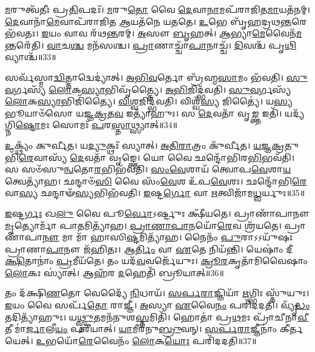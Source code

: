 \-\ul{𑌮}\-𑌰𑍁𑌤𑍍𑌵᳴𑌤𑍀𑌃 𑌪𑍍𑌰\-\ul{𑌤𑌿}\-𑌪𑌦𑌃᳴।
\-\ul{𑌮}\-𑌰𑍁\-\ul{𑌤𑍋} 𑌵𑍈 \ul{𑌦𑍇}\-𑌵𑌾\-\ul{𑌨𑌾}\-𑌮𑌪᳴𑌰𑌾𑌜𑌿𑌤\-\ul{𑌮𑌾}\-𑌯𑌤᳴𑌨𑌮𑍍।
\-\ul{𑌦𑍇}\-𑌵𑌾𑌨𑌾᳴\-\ul{𑌮𑍇}\-𑌵𑌾𑌪᳴𑌰𑌾𑌜𑌿𑌤 \ul{𑌆}\-𑌯𑌤᳴𑌨𑍇 𑌯𑌤𑌤𑍇।
\-\ul{𑌉}\-𑌭𑍇 𑌬𑍃᳴𑌹𑌦𑍍𑌰𑌥\-\ul{𑌨𑍍𑌤}\-𑌰𑍇 𑌭᳴𑌵𑌤𑌃।
\-\ul{𑌇}\-𑌯𑌂 𑌵𑌾𑌵 𑌰᳴𑌥\-\ul{𑌨𑍍𑌤}\-𑌰𑌮𑍍।
\-\ul{𑌅}\-𑌸𑍗 \ul{𑌬𑍃}\-𑌹𑌤𑍍।
\-\ul{𑌆}\-𑌭𑍍𑌯𑌾\-\ul{𑌮𑍇}\-𑌵𑍈𑌨᳴\-\ul{𑌮}\-𑌨𑍍𑌤𑌰𑍇᳴𑌤𑌿।
\-\ul{𑌵𑌾}\-𑌚\-\ul{𑌶𑍍𑌚} 𑌮𑌨᳴𑌸𑌶𑍍𑌚।
\-\ul{𑌪𑍍𑌰𑌾}\-𑌣𑌾𑌚𑍍𑌚𑌾᳴\-\ul{𑌪𑌾}\-𑌨𑌾𑌚𑍍𑌚᳴।
\-\ul{𑌦𑌿}\-𑌵𑌶𑍍𑌚᳴ 𑌪𑍃\-\ul{𑌥𑌿}\-𑌵𑍍𑌯𑌾𑌶𑍍𑌚᳴॥33॥

𑌸𑌰𑍍𑌵᳴𑌸𑍍𑌮𑌾\-\ul{𑌦𑍍𑌵𑌿}\-𑌤𑍍𑌤𑌾𑌦𑍍𑌵𑍇𑌦𑍍𑌯𑌾॑𑌤𑍍।
\-\ul{𑌅}\-\-\ul{𑌭𑌿}\-\-\ul{𑌵}\-𑌰𑍍𑌤𑍋 𑌬𑍍𑌰᳴𑌹𑍍𑌮\-\ul{𑌸𑌾}\-𑌮𑌂 𑌭᳴𑌵𑌤𑌿।
\-\ul{𑌸𑍁}\-\-\ul{𑌵}\-𑌰𑍍𑌗𑌸𑍍𑌯᳴ \ul{𑌲𑍋}\-𑌕\-\ul{𑌸𑍍𑌯𑌾}\-𑌭𑌿𑌵𑍃᳴𑌤𑍍𑌤𑍍𑌯𑍈।
\-\ul{𑌅}\-\-\ul{𑌭𑌿}\-𑌜𑌿𑌦𑍍𑌭᳴𑌵𑌤𑌿।
\-\ul{𑌸𑍁}\-\-\ul{𑌵}\-𑌰𑍍𑌗𑌸𑍍𑌯᳴ \ul{𑌲𑍋}\-𑌕\-\ul{𑌸𑍍𑌯𑌾}\-𑌭𑌿𑌜𑌿᳴𑌤𑍍𑌯𑍈।
\-\ul{𑌵𑌿}\-\-\ul{𑌶𑍍𑌵}\-𑌜𑌿𑌦𑍍𑌭᳴𑌵𑌤𑌿।
𑌵𑌿𑌶𑍍𑌵᳴\-\ul{𑌸𑍍𑌯} 𑌜𑌿𑌤𑍍𑌯𑍈॑।
𑌯\-\ul{𑌸𑍍𑌯} 𑌭𑍂𑌯𑌾𑍞᳴𑌸𑍋 𑌯𑌜𑍍𑌞\-\ul{𑌕𑍍𑌰}\-𑌤\-\ul{𑌵} 𑌇𑌤𑍍𑌯𑌾᳴𑌹𑍁𑌃।
𑌸 \ul{𑌦𑍇}\-𑌵𑌤𑌾᳴ 𑌵𑍃\-\ul{𑌙𑍍𑌕𑍍𑌤} 𑌇𑌤𑌿᳴।
𑌯𑌦𑍍𑌯᳴𑌗𑍍𑌨𑌿\-\ul{𑌷𑍍𑌟𑍋}\-𑌮𑌃 𑌸𑍋𑌮𑌃᳴ \ul{𑌪}\-𑌰\-\ul{𑌸𑍍𑌤𑌾}\-𑌥𑍍𑌸𑍍𑌯𑌾𑌤𑍍॥34॥

\-\ul{𑌉}\-𑌕𑍍𑌥𑍍𑌯𑌂᳴ 𑌕𑍁𑌰𑍍𑌵𑍀𑌤।
𑌯\-\ul{𑌦𑍍𑌯𑍁}\-𑌕𑍍𑌥𑌃᳴ 𑌸𑍍𑌯𑌾𑌤𑍍।
\-\ul{𑌅}\-\-\ul{𑌤𑌿}\-\-\ul{𑌰𑌾}\-𑌤𑍍𑌰𑌂 𑌕𑍁᳴𑌰𑍍𑌵𑍀𑌤।
\-\ul{𑌯}\-\-\ul{𑌜𑍍𑌞}\-\-\ul{𑌕𑍍𑌰}\-𑌤𑍁𑌭𑌿᳴\-\ul{𑌰𑍇}\-𑌵𑌾𑌸𑍍𑌯᳴ \ul{𑌦𑍇}\-𑌵𑌤𑌾᳴ 𑌵𑍃𑌙𑍍𑌕𑍍𑌤𑍇।
𑌯𑍋 𑌵𑍈 𑌛𑌨𑍍𑌦𑍋᳴𑌭𑌿𑌰\-\ul{𑌭𑌿}\-𑌭𑌵᳴𑌤𑌿।
𑌸 𑌸𑍞᳴𑌸𑍁\-\ul{𑌨𑍍𑌵}\-𑌤𑍋\-\ul{𑌰}\-𑌭𑌿𑌭᳴𑌵𑌤𑌿।
\-\ul{𑌸𑌂}\-\-\ul{𑌵𑍇}\-𑌶𑌾𑌯᳴ 𑌤𑍍𑌵𑍋𑌪\-\ul{𑌵𑍇}\-𑌶𑌾\-\ul{𑌯} 𑌤𑍍𑌵𑍇𑌤𑍍𑌯𑌾᳴𑌹।
𑌛𑌨𑍍𑌦𑌾𑍞᳴\-\ul{𑌸𑌿} 𑌵𑍈 𑌸𑌂᳴\-\ul{𑌵𑍇}\-𑌶 𑌉᳴𑌪\-\ul{𑌵𑍇}\-𑌶𑌃।
𑌛𑌨𑍍𑌦𑍋᳴𑌭𑌿\-\ul{𑌰𑍇}\-𑌵𑌾\-\ul{𑌸𑍍𑌯} 𑌛𑌨𑍍𑌦𑌾𑍟᳴\-\ul{𑌸𑍍𑌯}\-𑌭𑌿𑌭᳴𑌵𑌤𑌿।
\-\ul{𑌇}\-𑌷𑍍𑌟\-\ul{𑌰𑍍𑌗𑍋} 𑌵𑌾 \ul{𑌋}\-𑌤𑍍𑌵𑌿𑌜𑌾᳴𑌮\-\ul{𑌧𑍍𑌵}\-𑌰𑍍𑌯𑍁𑌃॥35॥

\-\ul{𑌇}\-𑌷𑍍𑌟\-\ul{𑌰𑍍𑌗𑌃} 𑌖\-\ul{𑌲𑍁} 𑌵𑍈 𑌪𑍂\-\ul{𑌰𑍍𑌵𑍋}\-\-𑌽𑌰𑍍𑌷𑍍𑌟𑍁𑌃 𑌕𑍍𑌷𑍀᳴𑌯𑌤𑍇।
𑌪𑍍𑌰𑌾𑌣𑌾᳴𑌪𑌾𑌨𑍗 \ul{𑌮𑍃}\-𑌤𑍍𑌯𑍋𑌰𑍍𑌮𑌾᳴ 𑌪𑌾\-\ul{𑌤}\-𑌮𑌿𑌤𑍍𑌯𑌾᳴𑌹।
\-\ul{𑌪𑍍𑌰𑌾}\-\-\ul{𑌣𑌾}\-\-\ul{𑌪𑌾}\-𑌨𑌯𑍋᳴\-\ul{𑌰𑍇}\-𑌵 𑌶𑍍𑌰᳴𑌯𑌤𑍇।
𑌪𑍍𑌰𑌾𑌣𑌾᳴𑌪𑌾\-\ul{𑌨𑍗} 𑌮𑌾 𑌮𑌾᳴ 𑌹𑌾𑌸𑌿\-\ul{𑌷𑍍𑌟}\-𑌮𑌿𑌤𑍍𑌯𑌾᳴𑌹।
𑌨𑍈𑌨𑌂᳴ \ul{𑌪𑍁}\-𑌰𑌾\-𑌽𑌽𑌯𑍁᳴𑌷𑌃 𑌪𑍍𑌰𑌾𑌣𑌾\-\ul{𑌪𑌾}\-𑌨𑍗 𑌜᳴𑌹𑌿𑌤𑌃।
𑌆\-\ul{𑌰𑍍𑌤𑌿𑌂} 𑌵𑌾 \ul{𑌏}\-𑌤𑍇 𑌨𑌿𑌯᳴𑌨𑍍𑌤𑌿।
𑌯𑍇𑌷𑌾𑌂॑ 𑌦𑍀\-\ul{𑌕𑍍𑌷𑌿}\-𑌤𑌾𑌨𑌾𑌂॑ \ul{𑌪𑍍𑌰}\-𑌮𑍀𑌯᳴𑌤𑍇।
𑌤𑌂 𑌯𑌦᳴\-\ul{𑌵}\-𑌵𑌰𑍍𑌜𑍇᳴𑌯𑍁𑌃।
\-\ul{𑌕𑍍𑌰𑍂}\-\-\ul{𑌰}\-𑌕𑍃𑌤𑌾᳴𑌮𑌿𑌵𑍈𑌷𑌾𑌂 \ul{𑌲𑍋}\-𑌕𑌃 𑌸𑍍𑌯𑌾॑𑌤𑍍।
𑌆𑌹᳴𑌰 \ul{𑌦}\-𑌹𑍇𑌤𑌿᳴ 𑌬𑍍𑌰𑍂𑌯𑌾𑌤𑍍॥36॥

𑌤𑌂 𑌦᳴𑌕𑍍𑌷𑌿\-\ul{𑌣}\-𑌤𑍋 𑌵𑍇𑌦𑍍𑌯𑍈᳴ \ul{𑌨𑌿}\-𑌧𑌾𑌯᳴।
\-\ul{𑌸}\-\-\ul{𑌰𑍍𑌪}\-\-\ul{𑌰𑌾}\-𑌜𑍍𑌞𑌿𑌯𑌾᳴ \ul{𑌋}\-𑌗𑍍𑌭𑌿𑌃 𑌸𑍍𑌤𑍁᳴𑌯𑍁𑌃।
\-\ul{𑌇}\-𑌯𑌂 𑌵𑍈 𑌸𑌰𑍍𑌪᳴\-\ul{𑌤𑍋} 𑌰𑌾𑌜𑍍𑌞𑍀॑।
\-\ul{𑌅}\-𑌸𑍍𑌯𑌾 \ul{𑌏}\-𑌵𑍈\-\ul{𑌨𑌂} 𑌪𑌰𑌿᳴𑌦𑌦𑌤𑌿।
𑌵𑍍𑌯𑍃᳴\-\ul{𑌦𑍍𑌧𑌂} 𑌤𑌦𑌿𑌤𑍍𑌯𑌾᳴𑌹𑍁𑌃।
𑌯\-\ul{𑌥𑍍𑌸𑍍𑌤𑍁}\-𑌤𑌮𑌨᳴𑌨𑍁𑌶\-\ul{𑌸𑍍𑌤}\-𑌮𑌿𑌤𑌿᳴।
𑌹𑍋𑌤𑌾॑ 𑌪𑍍𑌰\-\ul{𑌥}\-𑌮𑌃 𑌪𑍍𑌰𑌾᳴𑌚𑍀𑌨𑌾\-\ul{𑌵𑍀}\-𑌤𑍀 𑌮𑌾॑\-\ul{𑌰𑍍𑌜𑌾}\-𑌲𑍀\-\ul{𑌯𑌂} 𑌪𑌰𑍀᳴𑌯𑌾𑌤𑍍।
\-\ul{𑌯𑌾}\-𑌮𑍀𑌰᳴𑌨𑍁\-\ul{𑌬𑍍𑌰𑍁}\-𑌵𑌨𑍍।
\-\ul{𑌸}\-\-\ul{𑌰𑍍𑌪}\-\-\ul{𑌰𑌾}\-𑌜𑍍𑌞𑍀𑌨𑌾𑌂॑ 𑌕𑍀𑌰𑍍𑌤𑌯𑍇𑌤𑍍।
\-\ul{𑌉}\-𑌭𑌯𑍋᳴\-\ul{𑌰𑍇}\-𑌵𑍈𑌨𑌂᳴ \ul{𑌲𑍋}\-𑌕\-\ul{𑌯𑍋𑌃} 𑌪𑌰𑌿᳴𑌦𑌦𑌤𑌿॥37॥


